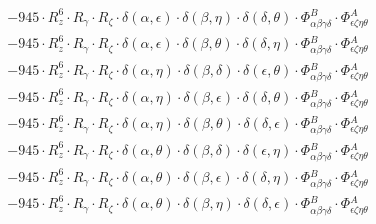 \documentclass{article}
\begin{document}
\begin{equation}
\begin{array}{c}
 \\[0.2em] 		 - 945 \cdot R_{z}^{6} \cdot R_{\gamma{}} \cdot R_{\zeta{}} \cdot \delta{}\left(\alpha{}, \epsilon{}\right) \cdot \delta{}\left(\beta{}, \eta{}\right) \cdot \delta{}\left(\delta{}, \theta{}\right) \cdot \Phi{}^{B}_{\alpha{}\beta{}\gamma{}\delta{}} \cdot \Phi{}^{A}_{\epsilon{}\zeta{}\eta{}\theta{}} 
 \\[0.2em] 		 - 945 \cdot R_{z}^{6} \cdot R_{\gamma{}} \cdot R_{\zeta{}} \cdot \delta{}\left(\alpha{}, \epsilon{}\right) \cdot \delta{}\left(\beta{}, \theta{}\right) \cdot \delta{}\left(\delta{}, \eta{}\right) \cdot \Phi{}^{B}_{\alpha{}\beta{}\gamma{}\delta{}} \cdot \Phi{}^{A}_{\epsilon{}\zeta{}\eta{}\theta{}} 
 \\[0.2em] 		 - 945 \cdot R_{z}^{6} \cdot R_{\gamma{}} \cdot R_{\zeta{}} \cdot \delta{}\left(\alpha{}, \eta{}\right) \cdot \delta{}\left(\beta{}, \delta{}\right) \cdot \delta{}\left(\epsilon{}, \theta{}\right) \cdot \Phi{}^{B}_{\alpha{}\beta{}\gamma{}\delta{}} \cdot \Phi{}^{A}_{\epsilon{}\zeta{}\eta{}\theta{}} 
 \\[0.2em] 		 - 945 \cdot R_{z}^{6} \cdot R_{\gamma{}} \cdot R_{\zeta{}} \cdot \delta{}\left(\alpha{}, \eta{}\right) \cdot \delta{}\left(\beta{}, \epsilon{}\right) \cdot \delta{}\left(\delta{}, \theta{}\right) \cdot \Phi{}^{B}_{\alpha{}\beta{}\gamma{}\delta{}} \cdot \Phi{}^{A}_{\epsilon{}\zeta{}\eta{}\theta{}} 
 \\[0.2em] 		 - 945 \cdot R_{z}^{6} \cdot R_{\gamma{}} \cdot R_{\zeta{}} \cdot \delta{}\left(\alpha{}, \eta{}\right) \cdot \delta{}\left(\beta{}, \theta{}\right) \cdot \delta{}\left(\delta{}, \epsilon{}\right) \cdot \Phi{}^{B}_{\alpha{}\beta{}\gamma{}\delta{}} \cdot \Phi{}^{A}_{\epsilon{}\zeta{}\eta{}\theta{}} 
 \\[0.2em] 		 - 945 \cdot R_{z}^{6} \cdot R_{\gamma{}} \cdot R_{\zeta{}} \cdot \delta{}\left(\alpha{}, \theta{}\right) \cdot \delta{}\left(\beta{}, \delta{}\right) \cdot \delta{}\left(\epsilon{}, \eta{}\right) \cdot \Phi{}^{B}_{\alpha{}\beta{}\gamma{}\delta{}} \cdot \Phi{}^{A}_{\epsilon{}\zeta{}\eta{}\theta{}} 
 \\[0.2em] 		 - 945 \cdot R_{z}^{6} \cdot R_{\gamma{}} \cdot R_{\zeta{}} \cdot \delta{}\left(\alpha{}, \theta{}\right) \cdot \delta{}\left(\beta{}, \epsilon{}\right) \cdot \delta{}\left(\delta{}, \eta{}\right) \cdot \Phi{}^{B}_{\alpha{}\beta{}\gamma{}\delta{}} \cdot \Phi{}^{A}_{\epsilon{}\zeta{}\eta{}\theta{}} 
 \\[0.2em] 		 - 945 \cdot R_{z}^{6} \cdot R_{\gamma{}} \cdot R_{\zeta{}} \cdot \delta{}\left(\alpha{}, \theta{}\right) \cdot \delta{}\left(\beta{}, \eta{}\right) \cdot \delta{}\left(\delta{}, \epsilon{}\right) \cdot \Phi{}^{B}_{\alpha{}\beta{}\gamma{}\delta{}} \cdot \Phi{}^{A}_{\epsilon{}\zeta{}\eta{}\theta{}} 

\end{array}
\end{equation}
\end{document}
